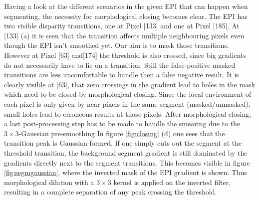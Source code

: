 \documentclass  [
  paper    = a4,
  BCOR     = 10mm,
  twoside,
  fontsize = 12pt,
  fleqn,
  toc      = bibnumbered,
  toc      = listofnumbered,
  numbers  = noendperiod,
  headings = normal,
  listof   = leveldown,
  version  = 3.03
]                                       {scrreprt}
\begin{document}
 Having a look at the different scenarios in the given EPI that can happen when segmenting, the necessity for morphological closing becomes clear. The EPI has two visible disparity transitions, one at Pixel [133] and one at Pixel [185]. At [133] (a) it is seen that the transition affects multiple neighbouring pixels even though the EPI isn't smoothed yet. Our aim is to mask those transitions. However at Pixel [63] and[174] the threshold is also crossed, since big gradients do not necessarily have to lie on a transition. Still the false-positive masked transitions are less uncomfortable to handle then a false negative result. It is clearly visible at [63], that zero crossings in the gradient lead to holes in the mask which need to be closed by morphological closing. Since the local environment of each pixel is only given by near pixels in the same segment (masked/unmasked), small holes lead to erroneous results at those pixels. After morphological closing, a last post-processing step has to be made to handle the smearing due to the $3\times 3$-Gaussian pre-smoothing In figure \ref{fig:closing} (d) one sees that the transition peak is Gaussian-formed. If one simply cuts out the segment at the threshold transition, the background segment gradient is still dominated by the gradients directly next to the segment transitions. This becomes visible in figure \ref{fig:segmgaussian}, where the inverted mask of the EPI gradient is shown. Thus morphological dilation with a $3\times3$ kernel is applied on the inverted filter, resulting in a complete separation of any peak crossing the threshold.
 
 
 
\end{document}
